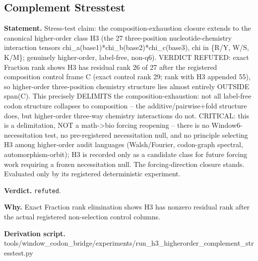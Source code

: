 \subsection{Complement Stresstest}\label{sec:bridge-complement-stresstest}
\textbf{Statement.} Stress-test claim: the composition-exhaustion closure extends to the canonical higher-order class H3
(the 27 three-position nucleotide-chemistry interaction tensors
chi\_a(base1)*chi\_b(base2)*chi\_c(base3), chi in \{R/Y, W/S, K/M\}; genuinely higher-order,
label-free, non-q6). VERDICT REFUTED: exact Fraction rank shows H3 has residual rank 26 of 27 after
the registered composition control frame C (exact control rank 29; rank with H3 appended 55), so
higher-order three-position chemistry structure lies almost entirely OUTSIDE span(C). This precisely
DELIMITS the composition-exhaustion: not all label-free codon structure collapses to composition --
the additive/pairwise+fold structure does, but higher-order three-way chemistry interactions do not.
CRITICAL: this is a delimitation, NOT a math->bio forcing reopening -- there is no
Window6-necessitation test, no pre-registered necessitation null, and no principle selecting H3
among higher-order audit languages (Walsh/Fourier, codon-graph spectral, automorphism-orbit); H3 is
recorded only as a candidate class for future forcing work requiring a frozen necessitation null.
The forcing-direction closure stands. Evaluated only by its registered deterministic experiment.

\textbf{Verdict.} \texttt{refuted}.

\textbf{Why.} Exact Fraction rank elimination shows H3 has nonzero residual rank after the actual registered
non-selection control columns.

\textbf{Derivation script.} tools/window\_codon\_bridge/experiments/run\_h3\_higherorder\_complement\_stresstest.py

